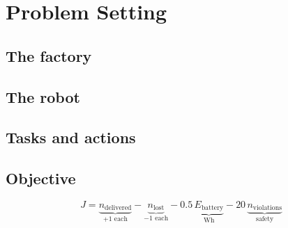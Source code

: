 \chapter{Problem Setting}
\label{ch:problem}


\section{The factory}
\label{sec:factory}

\section{The robot}
\label{sec:robot}

\section{Tasks and actions}
\label{sec:actions}

\section{Objective}
\label{sec:objective}
\begin{equation}
  \label{eq:objective}
  J = \underbrace{n_{\text{delivered}}}_{+1 \text{ each}}
    - \underbrace{n_{\text{lost}}}_{-1 \text{ each}}
    - 0.5\,\underbrace{E_{\text{battery}}}_{\si{\watt\hour}}
    - 20\,\underbrace{n_{\text{violations}}}_{\text{safety}}
\end{equation}

